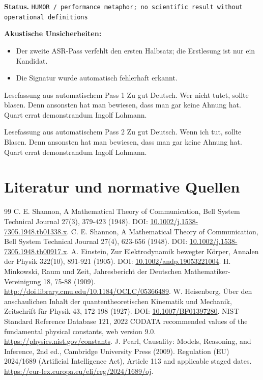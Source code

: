 \documentclass[11pt,a4paper]{article}
\newcommand{\status}[1]{\texttt{#1}}
\begin{document}
\textbf{Status.} \status{HUMOR / performance metaphor; no scientific result without operational definitions}

\textbf{Akustische Unsicherheiten:}
\begin{itemize}
\item Der zweite ASR-Pass verfehlt den ersten Halbsatz; die Erstlesung ist nur ein Kandidat.
\item Die Signatur wurde automatisch fehlerhaft erkannt.
\end{itemize}

\begin{asrbox}{Lesefassung aus automatischem Pass 1}
Zu gut Deutsch. Wer nicht tutet, sollte blasen. Denn ansonsten hat man bewiesen, dass man gar keine Ahnung hat. Quart errat demonstrandum Ingolf Lohmann.
\end{asrbox}

\begin{asrbox}{Lesefassung aus automatischem Pass 2}
Zu gut Deutsch. Wenn ich tut, sollte Blasen. Denn ansonsten hat man bewiesen, dass man gar keine Ahnung hat. Quart errat demonstrandum Ingolf Lohmann.
\end{asrbox}

\section{Literatur und normative Quellen}
\begin{thebibliography}{99}
 C. E. Shannon, A Mathematical Theory of Communication, Bell System Technical Journal 27(3), 379-423 (1948). DOI: \href{https://doi.org/10.1002/j.1538-7305.1948.tb01338.x}{10.1002/j.1538-7305.1948.tb01338.x}.
 C. E. Shannon, A Mathematical Theory of Communication, Bell System Technical Journal 27(4), 623-656 (1948). DOI: \href{https://doi.org/10.1002/j.1538-7305.1948.tb00917.x}{10.1002/j.1538-7305.1948.tb00917.x}.
 A. Einstein, Zur Elektrodynamik bewegter Körper, Annalen der Physik 322(10), 891-921 (1905). DOI: \href{https://doi.org/10.1002/andp.19053221004}{10.1002/andp.19053221004}.
 H. Minkowski, Raum und Zeit, Jahresbericht der Deutschen Mathematiker-Vereinigung 18, 75-88 (1909). \url{http://doi.library.cmu.edu/10.1184/OCLC/05366489}.
 W. Heisenberg, Über den anschaulichen Inhalt der quantentheoretischen Kinematik und Mechanik, Zeitschrift für Physik 43, 172-198 (1927). DOI: \href{https://doi.org/10.1007/BF01397280}{10.1007/BF01397280}.
 NIST Standard Reference Database 121, 2022 CODATA recommended values of the fundamental physical constants, web version 9.0. \url{https://physics.nist.gov/constants}.
 J. Pearl, Causality: Models, Reasoning, and Inference, 2nd ed., Cambridge University Press (2009).
 Regulation (EU) 2024/1689 (Artificial Intelligence Act), Article 113 and applicable staged dates. \url{https://eur-lex.europa.eu/eli/reg/2024/1689/oj}.
\end{thebibliography}
\end{document}
